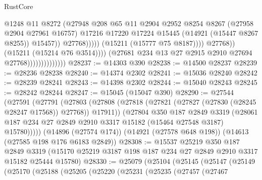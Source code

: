 \begin{lexlean}{RustCore}
\begin{coremodule}
                                                      @1248
                                                      @11
                                                      @8272
                                                      (@27948
                                                        @208
                                                        @65
                                                        @11
                                                        @2904
                                                        @2952
                                                        @8254
                                                        @8267
                                                        (@27958 @2904 @27961 @16757)
                                                        @17216
                                                        @17220
                                                        @17224
                                                        @15445
                                                        (@14921 (@15447 @8267 @8255))
                                                        @15457))
                                                    @27768)))))
                                          (@15211 (@15777 @75 @8187))))
                                      @27768))
                                  (@15211 (@15214 @76 @3514))))
                              (@27681 @234 @13 @27 @2915 @2910 @27694 @27768))))))))))))))
@28237 := @14303 @390
@28238 := @14500 @28237
@28239 := @28236 @28238
@28240 := @14374 @2302
@28241 := @15036 @28240
@28242 := @28239 @28241
@28243 := @14398 @2302
@28244 := @15040 @28243
@28245 := @28242 @28244
@28247 := @15045 (@15047 @390)
@28290 := @27544
    (@27591
      (@27791
        (@27803
          (@27808 (@27818 (@27821 (@27827 (@27830 (@28245 @28247 @17568)) @27768)) @17911))
          (@27804
            @350
            @187
            @2849
            @3319
            (@28061 @187 @234 @27 @2849 @2910 @3317 @15182 (@15464 @27548 @3187) @15780)))))
    (@14896 (@27574 @174))
    (@14921 (@27578 @648 @198))
    (@14613 (@27585 @198 @176 @6183 @2849))
@28308 := @15537
    @25219
    @350
    @187
    @2849
    @3319
    (@15170 @25219 @3187 @198 @187 @234 @27 @2849 @2910 @3317 @15182 @25444 @15780)
@28330 := @25079
    (@25104
      (@25145
        (@25147
          (@25149
            (@25170
              (@25188
                (@25205
                  (@25220
                    (@25231
                      (@25235
                        (@27457
                          (@27467

\end{coremodule}
\end{lexlean}
